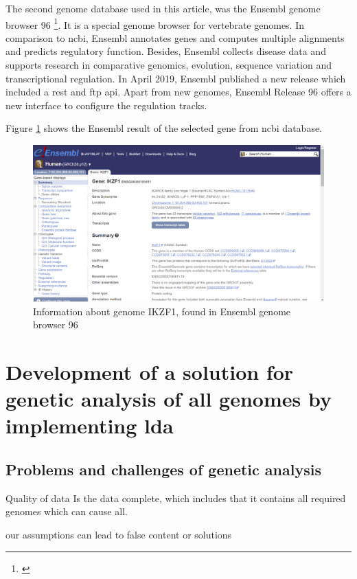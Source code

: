 The second genome database used in this article, was the Ensembl genome browser 96 \footnote{\autocite{ensembl}}. It is a special genome browser for vertebrate genomes. In comparison to \gls{ncbi}, Ensembl annotates genes and computes multiple alignments and predicts regulatory function. Besides, Ensembl collects disease data and supports research in comparative genomics, evolution, sequence variation and transcriptional regulation.
In April 2019, Ensembl published a new release which included a \gls{rest} and \gls{ftp} \gls{api}. Apart from new genomes, Ensembl Release 96 offers a new interface to configure the regulation tracks.

Figure \ref{ensembl_result} shows the Ensembl result of the selected gene from \gls{ncbi} database.

\begin{figure}[htbp]
	\centering
	\includegraphics[width=1\textwidth]{Image/ensembl_ikzf1.png}
	\caption{Information about genome IKZF1, found in Ensembl genome browser 96}
	\label{ensembl_result}
\end{figure}

\chapter{Development of a solution for genetic analysis of \gls{all} genomes by implementing \gls{lda}}\label{development}
\section{Problems and challenges of genetic analysis}\label{problems_challenges}
Quality of data 
Is the data complete, which includes that it contains all required genomes which can cause \gls{all}.

our assumptions can lead to false content or solutions 

